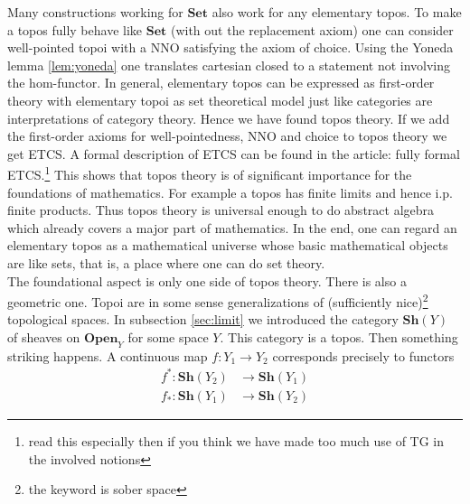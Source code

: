 Many constructions working for $\mathbf{Set}$ also work for any elementary topos. To make a topos fully behave like $\mathbf{Set}$ (with out the replacement axiom) one can consider well-pointed topoi with a NNO satisfying the axiom of choice. Using the Yoneda lemma \ref{lem:yoneda} one translates cartesian closed to a statement not involving the hom-functor. In general, elementary topos can be expressed as first-order theory with elementary topoi as set theoretical model just like categories are interpretations of category theory. Hence we have found topos theory. If we add the first-order axioms for well-pointedness, NNO and choice to topos theory we get ETCS. A formal description of ETCS can be found in the \cite{wiki-nlab0000} article: fully formal ETCS.\footnote{read this especially then if you think we have made too much use of TG in the involved notions} This shows that topos theory is of significant importance for the foundations of mathematics. For example a topos has finite limits and hence i.p. finite products. Thus topos theory is universal enough to do abstract algebra which already covers a major part of mathematics. In the end, one can regard an elementary topos as a mathematical universe whose basic mathematical objects are like sets, that is, a place where one can do set theory.
\\
The foundational aspect is only one side of topos theory. There is also a geometric one. Topoi are in some sense generalizations of (sufficiently nice)\footnote{the keyword is sober space} topological spaces. In subsection \ref{sec:limit} we introduced the category $\mathbf{Sh}(Y)$ of sheaves on $\mathbf{Open}_{Y}$ for some space $Y$. This category is a topos. Then something striking happens. A continuous map $f \colon Y_{1} \rightarrow Y_{2}$ corresponds precisely to functors
\begin{align*}
  f^{\ast}
  \colon
  \mathbf{Sh}(Y_{2})
  &\rightarrow
  \mathbf{Sh}(Y_{1})
  \\
  f_{\ast}
  \colon
  \mathbf{Sh}(Y_{1})
  &\rightarrow
  \mathbf{Sh}(Y_{2})
\end{align*}
